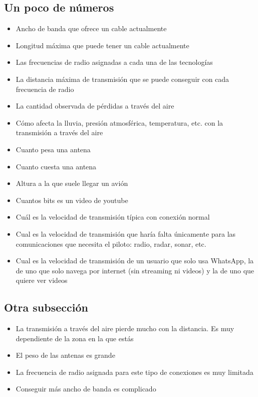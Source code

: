 \documentclass[a6paper]{article}
\begin{document}
        \subsection{Un poco de números}
            \begin{itemize}
                \item Ancho de banda que ofrece un cable actualmente
                \item Longitud máxima que puede tener un cable actualmente
                \item Las frecuencias de radio asignadas a cada una de las tecnologías
                \item La distancia máxima de transmisión que se puede conseguir con cada frecuencia de radio
                \item La cantidad observada de pérdidas a través del aire
                \item Cómo afecta la lluvia, presión atmosférica, temperatura, etc. con la transmisión a través del aire
                \item Cuanto pesa una antena
                \item Cuanto cuesta una antena
                \item Altura a la que suele llegar un avión
                \item Cuantos bits es un video de youtube
                \item Cuál es la velocidad de transmisión típica con conexión normal
                \item Cual es la velocidad de transmisión que haría falta únicamente  para las comunicaciones que necesita el piloto: radio, radar, sonar, etc.
                \item Cual es la velocidad de transmisión de un usuario que solo usa WhatsApp, la de uno que solo navega por internet (sin streaming ni videos) y la de uno que quiere ver videos
            \end{itemize}
        \subsection{Otra subsección}
        \begin{itemize}
            \item La transmisión a través del aire pierde mucho con la distancia. Es muy dependiente de la zona en la que estás
            \item El peso de las antenas es grande
            \item La frecuencia de radio asignada para este tipo de conexiones es muy limitada
            \item Conseguir más ancho de banda es complicado
        \end{itemize}
\end{document}
